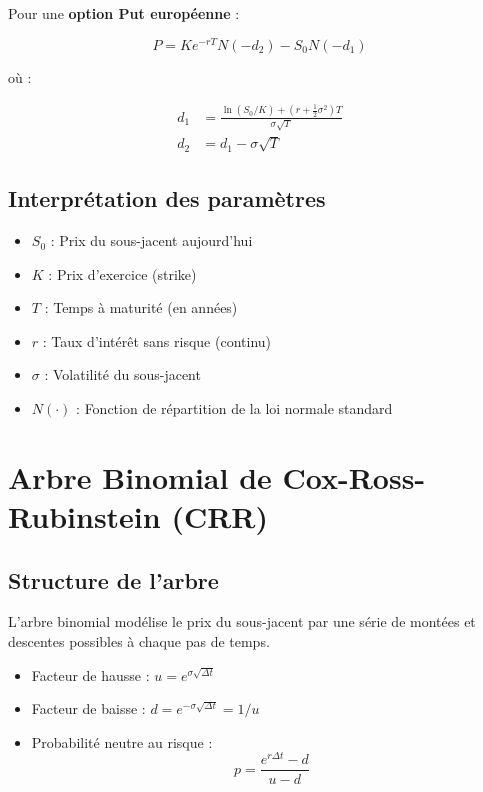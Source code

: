\documentclass{article}
\begin{document}
Pour une \textbf{option Put européenne} :

\begin{equation}
P = Ke^{-rT} N(-d_2) - S_0 N(-d_1)
\end{equation}

où :

\begin{align}
d_1 &= \frac{\ln(S_0/K) + (r + \frac{1}{2}\sigma^2)T}{\sigma \sqrt{T}} \\
d_2 &= d_1 - \sigma \sqrt{T}
\end{align}

\subsection{Interprétation des paramètres}

\begin{itemize}
    \item \( S_0 \) : Prix du sous-jacent aujourd'hui
    \item \( K \) : Prix d'exercice (strike)
    \item \( T \) : Temps à maturité (en années)
    \item \( r \) : Taux d'intérêt sans risque (continu)
    \item \( \sigma \) : Volatilité du sous-jacent
    \item \( N(\cdot) \) : Fonction de répartition de la loi normale standard
\end{itemize}

\section{Arbre Binomial de Cox-Ross-Rubinstein (CRR)}

\subsection{Structure de l'arbre}

L'arbre binomial modélise le prix du sous-jacent par une série de montées et descentes possibles à chaque pas de temps.

\begin{itemize}
    \item Facteur de hausse : \( u = e^{\sigma \sqrt{\Delta t}} \)
    \item Facteur de baisse : \( d = e^{-\sigma \sqrt{\Delta t}} = 1/u \)
    \item Probabilité neutre au risque : 
    \begin{equation}
    p = \frac{e^{r\Delta t} - d}{u - d}
    \end{equation}
\end{itemize}
\end{document}
